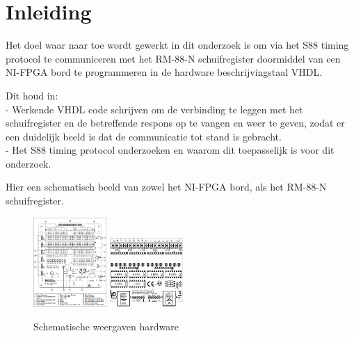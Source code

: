 	\chapter{Inleiding}
	
	Het doel waar naar toe wordt gewerkt in dit onderzoek is om via het S88 timing protocol te communiceren met het RM-88-N schuifregister doormiddel van een NI-FPGA bord te programmeren in de hardware beschrijvingstaal VHDL.
	
	Dit houd in: \\
	- Werkende VHDL code schrijven om de verbinding te leggen met het schuifregister en de betreffende respons op te vangen en weer te geven, zodat er een duidelijk beeld is dat de communicatie tot stand is gebracht. \\
	- Het S88 timing protocol onderzoeken en waarom dit toepasselijk is voor dit onderzoek.
	
	Hier een schematisch beeld van zowel het NI-FPGA bord, als het RM-88-N schuifregister.
	\begin{figure}[h]
		\begin{center}
			\includegraphics[width=105px]{./img/FPGA.png}\hspace{20mm}
			\includegraphics[width=105px]{./img/RM88.png}
			\caption{Schematische weergaven hardware}
		\end{center}
	\end{figure}
	
